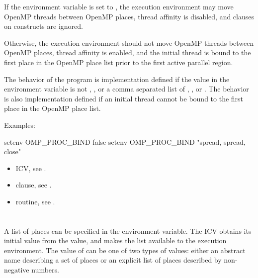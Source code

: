 If the environment variable is set to , the execution environment may move 
OpenMP threads between OpenMP places, thread affinity is disabled, and  
clauses on  constructs are ignored.

Otherwise, the execution environment should not move OpenMP threads between 
OpenMP places, thread affinity is enabled, and the initial thread is bound to the first 
place in the OpenMP place list prior to the first active parallel region.

The behavior of the program is implementation defined if the value in the 
 environment variable is not , , or a comma separated 
list of , , or . The behavior is also implementation defined if an 
initial thread cannot be bound to the first place in the OpenMP place list.

\pagebreak

Examples:
\begin{boxedcode}
setenv OMP\_PROC\_BIND false
setenv OMP\_PROC\_BIND "spread, spread, close"
\end{boxedcode}


\crossreferences
\begin{itemize}
\item {} ICV, see .

\item {} clause, see .

\item {} routine, see .
\end{itemize}









\section{}
\label{sec:OMP_PLACES}
A list of places can be specified in the  environment variable. The 
 ICV obtains its initial value from the  value, and makes the 
list available to the execution environment. The value of  can be one of 
two types of values: either an abstract name describing a set of places or an explicit list 
of places described by non-negative numbers.

